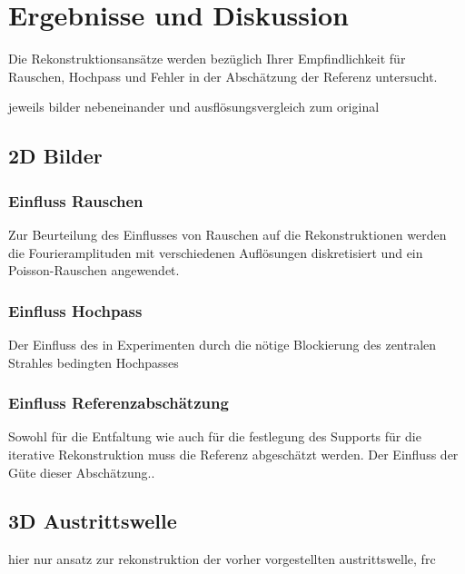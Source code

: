 \section{Ergebnisse und Diskussion}
Die Rekonstruktionsansätze werden bezüglich Ihrer Empfindlichkeit für Rauschen, Hochpass und Fehler in der Abschätzung der Referenz untersucht.

jeweils bilder nebeneinander und ausflösungsvergleich zum original

\subsection{2D Bilder}
\subsubsection{Einfluss Rauschen}
Zur Beurteilung des Einflusses von Rauschen auf die Rekonstruktionen werden die Fourieramplituden mit verschiedenen Auflösungen diskretisiert und ein Poisson-Rauschen angewendet.
\subsubsection{Einfluss Hochpass}
Der Einfluss des in Experimenten durch die nötige Blockierung des zentralen Strahles bedingten Hochpasses
\subsubsection{Einfluss Referenzabschätzung}
Sowohl für die Entfaltung wie auch für die festlegung des Supports für die iterative Rekonstruktion muss die Referenz abgeschätzt werden. Der Einfluss der Güte dieser Abschätzung..

\subsection{3D Austrittswelle}

hier nur ansatz zur rekonstruktion der vorher vorgestellten austrittswelle, frc

